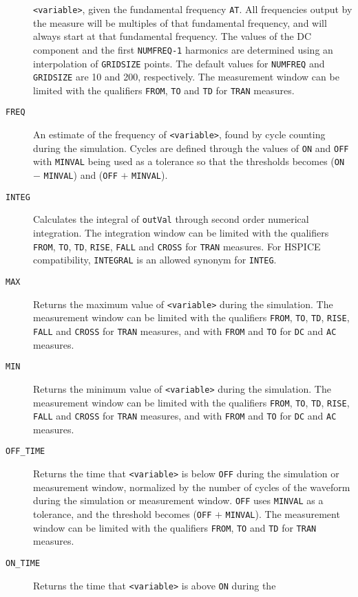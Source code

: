 \begin{Command}
\begin{Arguments}
\begin{description}
    {\tt <variable>}, given the fundamental frequency {\tt AT}.  All frequencies output 
    by the measure will be multiples of that fundamental frequency, and will always start 
    at that fundamental frequency. The values of the DC component and the
    first {\tt NUMFREQ-1} harmonics are determined using an interpolation of {\tt GRIDSIZE} points.
    The default values for {\tt NUMFREQ} and {\tt GRIDSIZE} are 10 and 200, respectively.  
    The measurement window can be limited with the qualifiers {\tt FROM}, {\tt TO} 
    and {\tt TD} for {\tt TRAN} measures.
  \item[\tt FREQ] An estimate of the frequency of {\tt <variable>}, found by cycle counting
    during the simulation.  Cycles are defined through the values of {\tt ON}
    and {\tt OFF} with {\tt MINVAL} being used as a tolerance so that the thresholds
    becomes ({\tt ON} $-$ {\tt MINVAL}) and ({\tt OFF} $+$ {\tt MINVAL}).     
  \item[\tt INTEG] Calculates the integral of {\tt outVal} through second order numerical
    integration.  The integration window can be limited with the qualifiers {\tt FROM},
    {\tt TO}, {\tt TD}, {\tt RISE}, {\tt FALL} and {\tt CROSS} for {\tt TRAN} measures.
    For HSPICE compatibility, {\tt INTEGRAL} is an allowed synonym for {\tt INTEG}.
  \item[\tt MAX]  Returns the maximum value of {\tt <variable>} during the simulation.
    The measurement window can be limited with the qualifiers {\tt FROM}, {\tt TO}, 
    {\tt TD}, {\tt RISE}, {\tt FALL} and {\tt CROSS} for {\tt TRAN} measures, and
    with {\tt FROM} and {\tt TO} for {\tt DC} and {\tt AC} measures. 
  \item[\tt MIN] Returns the minimum value of {\tt <variable>} during the simulation.
    The measurement window can be limited with the qualifiers {\tt FROM}, {\tt TO}, 
    {\tt TD}, {\tt RISE}, {\tt FALL} and {\tt CROSS} for {\tt TRAN} measures, and
    with {\tt FROM} and {\tt TO} for {\tt DC} and {\tt AC} measures. 
  \item[\tt OFF\_TIME] Returns the time that {\tt <variable>} is below {\tt OFF} during the 
    simulation or measurement window, normalized by the number of cycles of the waveform 
    during the simulation or measurement window.
    {\tt OFF} uses {\tt MINVAL} as a tolerance, and the threshold becomes ({\tt OFF} $+$ {\tt MINVAL}). 
    The measurement window can be limited with the qualifiers {\tt FROM}, {\tt TO} and {\tt TD}
    for {\tt TRAN} measures.
  \item[\tt ON\_TIME] Returns the time that {\tt <variable>} is above {\tt ON} during the

\end{description}
\end{Arguments}
\end{Command}

